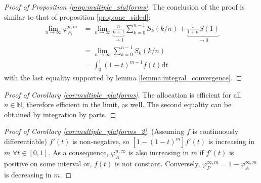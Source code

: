 \documentclass[a4paper]{article}
\newcommand{\dt}{\mathrm{d}t}
\begin{document}
\begin{proof}[Proof of Proposition \ref{prop:multiple_platforms}]
    The conclusion of the proof is similar to that of proposition \ref{prop:one_sided}:
    \begin{align*}
        \lim_{n \to \infty} \varphi_{P_i}^{n, m} &= \lim_{n \to \infty} \underbrace{\frac{n}{n+1}}_{\to 1} \sum_{k=0}^{n-1} S_k(k/n) + \underbrace{\frac{1}{1+n}S(1)}_{\to 0} \\
        &= \lim_{n \to \infty} \sum_{k=0}^{n-1} S_k(k/n) \\
        &= \int_0^1 (1-t)^{m-1} f(t) \dt
    \end{align*}
    with the last equality supported by lemma \ref{lemma:integral_convergence}.
\end{proof}

\begin{proof}[Proof of Corollary \ref{cor:multiple_platforms}]
    The allocation is efficient for all $n \in \mathbb{N}$, therefore efficient in the limit, as well. The second equality can be obtained by integration by parts.
\end{proof}

\begin{proof}[Proof of Corollary \ref{cor:multiple_platforms_2}] (Assuming $f$ is continuously differentiable) %
    $f'(t)$ is non-negative, so $[1 - (1-t)^m] f'(t)$ is increasing in $m$ $\forall t \in [0, 1]$. As a consequence, $\varphi_A^{n, \infty}$ is also increasing in $m$ if $f'(t)$ is positive on some interval or, $f(t)$ is not constant. Conversely, $\varphi_{P}^{\infty, m} = 1 - \varphi_{A}^{\infty, m}$ is decreasing in $m$.
\end{proof}
\end{document}
